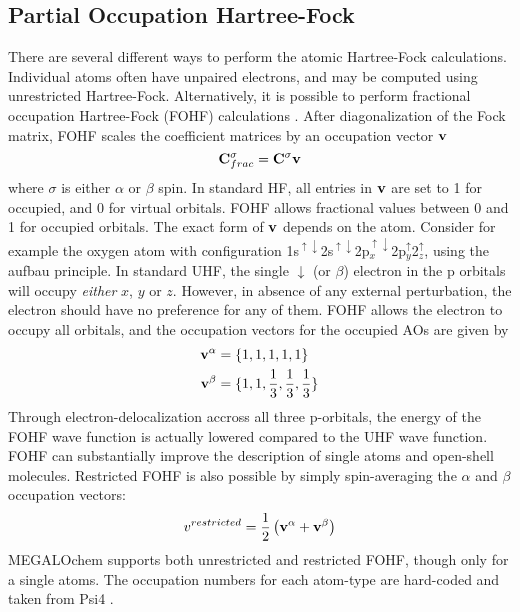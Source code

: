 \subsection{Partial Occupation Hartree-Fock}

There are several different ways to perform the atomic Hartree-Fock calculations. Individual atoms often have  unpaired electrons, and may be computed using unrestricted Hartree-Fock. Alternatively, it is possible to perform fractional occupation Hartree-Fock (FOHF) calculations \cite{Bra1980}. After diagonalization of the Fock matrix, FOHF scales the coefficient matrices by an occupation vector $\mathbf{v}$
\begin{equation}
\mathbf{C}^{\sigma}_{frac} = \mathbf{C}^{\sigma} \mathbf{v}
\end{equation} 
\noindent where $\sigma$ is either $\alpha$ or $\beta$ spin. In standard HF, all entries in $\mathbf{v}$ are set to 1 for occupied, and 0 for virtual orbitals. FOHF allows fractional values between 0 and 1 for occupied orbitals. The exact form of $\mathbf{v}$ depends on the atom. Consider for example the oxygen atom with configuration 1s$^{\uparrow\downarrow}$2s$^{\uparrow\downarrow}$2p$_x^{\uparrow\downarrow}$2p$_y^{\uparrow}$2$_z^{\uparrow}$, using the aufbau principle. In standard UHF, the single $\downarrow$ (or $\beta$) electron in the p orbitals will occupy \emph{either} $x$, $y$ or $z$. However, in absence of any external perturbation, the electron should have no preference for any of them. FOHF allows the electron to occupy all orbitals, and the occupation vectors for the occupied AOs are given by
\begin{align}
\mathbf{v}^{\alpha} &= \{1,1,1,1,1\} \\
\mathbf{v}^{\beta} &= \{1,1,\frac{1}{3},\frac{1}{3},\frac{1}{3}\}
\end{align}
\noindent Through electron-delocalization accross all three p-orbitals, the energy of the FOHF wave function is actually lowered compared to the UHF wave function. FOHF can substantially improve the description of single atoms and open-shell molecules. Restricted FOHF is also possible by simply spin-averaging the $\alpha$ and $\beta$ occupation vectors:
\begin{equation}
v^{restricted} = \frac{1}{2} \left( \mathbf{v}^{\alpha} + \mathbf{v}^{\beta} \right)
\end{equation}
\noindent MEGALOchem supports both unrestricted and restricted FOHF, though only for a single atoms. The occupation numbers for each atom-type are hard-coded and taken from Psi4 \cite{Tur2012}.

